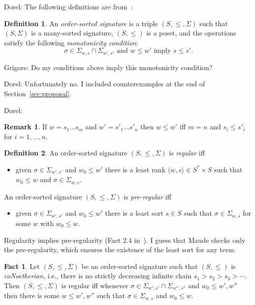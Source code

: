 \documentclass{article}
\newcommand\comment[2]{\par\noindent\color{red}#1: #2\color{black}\par\noindent}
\newcommand\dl{\comment{Dorel}}
\newcommand\gr{\comment{Grigore}}
\theoremstyle{definition}
\theoremstyle{definition}
\theoremstyle{definition}
\newtheorem{definition}{Definition}[section]
\theoremstyle{definition}
\newtheorem{remark}{Remark}[section]
\theoremstyle{theorem}
\theoremstyle{theorem}
\newtheorem{fact}{Fact}[section]
\theoremstyle{theorem}
\theoremstyle{theorem}
\theoremstyle{theorem}
\begin{document}
\dl{
The following definitions are from~\cite{osa}:\\
\begin{definition}
An \emph{order-sorted signature} is a triple $(S,\le,\Sigma)$ such that $(S,\Sigma)$ is a many-sorted signature, $(S, \le)$ is a poset, and the operations satisfy the following \emph{monotonicity condition}:
\[
\sigma\in\Sigma_{w,s}\cap\Sigma_{w',s'}\textrm{~and~}w\le w'\textrm{~imply~}s\le s'.
\]
\end{definition}
}
\gr{Do my conditions above imply this monotonicity condition?}
\dl{Unfortunately no. I included counterexamples at the end of Section~\ref{sec:proposal}.}
\dl{
\begin{remark}
If $w=s_1\ldots s_m$ and $w'=s'_1\ldots s'_n$ then $w\le w'$ iff $m = n$ and $s_i\le s'_i$ for $i=1,\ldots,n$.
\end{remark}

\begin{definition}
An order-sorted signature $(S,\le,\Sigma)$ is \emph{regular} iff
\begin{itemize}
\item given $\sigma\in\Sigma_{w',s'}$ and $w_0\le w'$ there is a least rank $\langle w,s\rangle\in S^*\times S$ such that $w_0\le w$ and $\sigma\in\Sigma_{w,s}$.
\end{itemize}
An order-sorted signature $(S,\le,\Sigma)$ is \emph{pre-regular} iff
\begin{itemize}
\item given $\sigma\in\Sigma_{w',s'}$ and $w_0\le w'$ there is a least sort $s\in S$ such that  $\sigma\in\Sigma_{w,s}$ for some $w$ with $w_0\le w$.
\end{itemize}

\end{definition}

Regularity implies pre-regularity (Fact 2.4 in~\cite{osa}). I guess that Maude checks only the pre-regularity, which ensures the existence of the least sort for any term. 

\begin{fact}\cite{osa}\label{fact:reg}
Let  $(S,\le,\Sigma)$ be an order-sorted signature such that $(S,\le)$ is \emph{coNoetherian}, i.e., there is no strictly decreasing infinite chain $s_1>s_2>s_3>\cdots$.
Then $(S,\le,\Sigma)$ is regular iff whenever $\sigma\in \Sigma_{w',s'}\cap\Sigma_{w'',s''}$ and $w_0\le w',w''$ then there is some $w\le w',w''$ such that $\sigma\in\Sigma_{w,s}$ and $w_0\le w$.
\end{fact}

}
\end{document}
